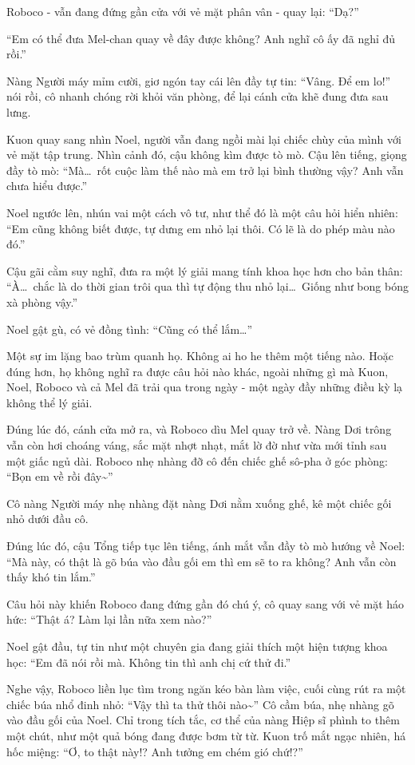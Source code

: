 \documentclass[../main.tex]{subfiles}
\begin{document}
Roboco - vẫn đang đứng gần cửa với vẻ mặt phân vân - quay lại: ``Dạ?''

``Em có thể đưa Mel-chan quay về đây được không? Anh nghĩ cô ấy đã nghỉ đủ rồi.''

Nàng Người máy mỉm cười, giơ ngón tay cái lên đầy tự tin: ``Vâng. Để em lo!'' nói rồi, cô nhanh chóng rời khỏi văn phòng, để lại cánh cửa khẽ đung đưa sau lưng.

Kuon quay sang nhìn Noel, người vẫn đang ngồi mài lại chiếc chùy của mình với vẻ mặt tập trung. Nhìn cảnh đó, cậu không kìm được tò mò. Cậu lên tiếng, giọng đầy tò mò: ``Mà\dots\ rốt cuộc làm thế nào mà em trở lại bình thường vậy? Anh vẫn chưa hiểu được.''

Noel ngước lên, nhún vai một cách vô tư, như thể đó là một câu hỏi hiển nhiên: ``Em cũng không biết được, tự dưng em nhỏ lại thôi. Có lẽ là do phép màu nào đó.''

Cậu gãi cằm suy nghĩ, đưa ra một lý giải mang tính khoa học hơn cho bản thân: ``À\dots\ chắc là do thời gian trôi qua thì tự động thu nhỏ lại\dots\ Giống như bong bóng xà phòng vậy.''

Noel gật gù, có vẻ đồng tình: ``Cũng có thể lắm\dots''

Một sự im lặng bao trùm quanh họ. Không ai ho he thêm một tiếng nào. Hoặc đúng hơn, họ không nghĩ ra được câu hỏi nào khác, ngoài những gì mà Kuon, Noel, Roboco và cả Mel đã trải qua trong ngày - một ngày đầy những điều kỳ lạ không thể lý giải.

Đúng lúc đó, cánh cửa mở ra, và Roboco dìu Mel quay trở về. Nàng Dơi trông vẫn còn hơi choáng váng, sắc mặt nhợt nhạt, mắt lờ đờ như vừa mới tỉnh sau một giấc ngủ dài. Roboco nhẹ nhàng đỡ cô đến chiếc ghế sô-pha ở góc phòng: ``Bọn em về rồi đây\~{}''

Cô nàng Người máy nhẹ nhàng đặt nàng Dơi nằm xuống ghế, kê một chiếc gối nhỏ dưới đầu cô.

Đúng lúc đó, cậu Tổng tiếp tục lên tiếng, ánh mắt vẫn đầy tò mò hướng về Noel: ``Mà này, có thật là gõ búa vào đầu gối em thì em sẽ to ra không? Anh vẫn còn thấy khó tin lắm.''

Câu hỏi này khiến Roboco đang đứng gần đó chú ý, cô quay sang với vẻ mặt háo hức: ``Thật á? Làm lại lần nữa xem nào?''

Noel gật đầu, tự tin như một chuyên gia đang giải thích một hiện tượng khoa học: ``Em đã nói rồi mà. Không tin thì anh chị cứ thử đi.''

Nghe vậy, Roboco liền lục tìm trong ngăn kéo bàn làm việc, cuối cùng rút ra một chiếc búa nhổ đinh nhỏ: ``Vậy thì ta thử thôi nào\~{}'' Cô cầm búa, nhẹ nhàng gõ vào đầu gối của Noel. Chỉ trong tích tắc, cơ thể của nàng Hiệp sĩ phình to thêm một chút, như một quả bóng đang được bơm từ từ. Kuon trố mắt ngạc nhiên, há hốc miệng: ``Ơ, to thật này!? Anh tưởng em chém gió chứ!?''
\end{document}
